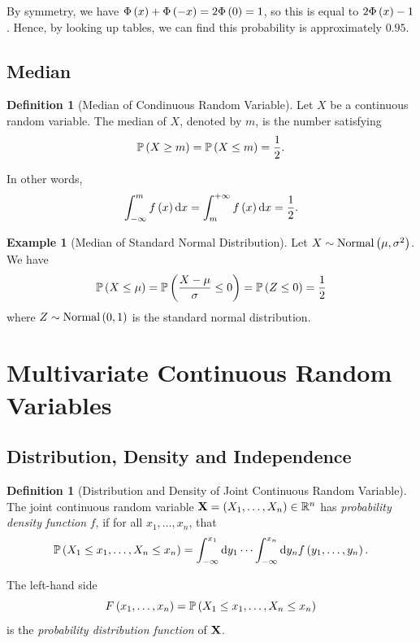 \documentclass{article}
\theoremstyle{definition}
\newtheorem{definition}[theorem]{Definition}
\newtheorem{example}[theorem]{Example}
\theoremstyle{remark}
\newcommand{\RR}{\mathbb{R}}
\newcommand{\Prob}{\mathbb{P}}
\newcommand{\plusinfty}{+\infty}
\newcommand{\minusinfty}{-\infty}
\newcommand{\sNormCdf}{\Phi}
\newcommand{\Normal}{\operatorname{Normal}}
\begin{document}
By symmetry, we have \(\sNormCdf\pqty{x} + \sNormCdf\pqty{-x} = 2 \sNormCdf\pqty{0} = 1\), so this is equal to \(2 \sNormCdf\pqty{x} - 1\). Hence, by looking up tables, we can find this probability is approximately \(0.95\).

\subsection{Median}

\begin{definition}[Median of Condinuous Random Variable]
    \label{def:median-continuous-rv}%
    Let \(X\) be a continuous random variable. The median of \(X\), denoted by \(m\), is the number satisfying
    \[
        \Prob\pqty{X \geq m} = \Prob\pqty{X \leq m} = \frac{1}{2}.
    \]

    In other words,
    \[
        \int_{\minusinfty}^{m} f\pqty{x} \dd{x} = \int_{m}^{\plusinfty} f\pqty{x} \dd{x} = \frac{1}{2}.
    \]
\end{definition}

\begin{example}[Median of Standard Normal Distribution]
    \label{ex:median-standard-normal}%
    Let \(X \sim \Normal\pqty{\mu, \sigma^2}\). We have
    \[
        \Prob\pqty{X \leq \mu} = \Prob\pqty{\frac{X - \mu}{\sigma} \leq 0} = \Prob\pqty{Z \leq 0} = \frac{1}{2}
    \]
    where \(Z \sim \Normal\pqty{0, 1}\) is the standard normal distribution.
\end{example}

\section{Multivariate Continuous Random Variables}

\subsection{Distribution, Density and Independence}

\begin{definition}[Distribution and Density of Joint Continuous Random Variable]
    \label{def:distribution-density-joint-crv}%
    The joint continuous random variable \(\vb{X} = \pqty{X_1, \ldots, X_n} \in \RR^n\) has \emph{probability density function} \(f\), if for all \(x_1, \ldots, x_n\), that
    \[
        \Prob\pqty{X_1 \leq x_1, \ldots, X_n \leq x_n} = \int_{\minusinfty}^{x_1} \dd{y_1} \cdots \int_{\minusinfty}^{x_n} \dd{y_n} f\pqty{y_1, \ldots, y_n}.
    \]

    The left-hand side
    \[
        F \pqty{x_1, \ldots, x_n} = \Prob\pqty{X_1 \leq x_1, \ldots, X_n \leq x_n}
    \]
    is the \emph{probability distribution function} of \(\vb{X}\).
\end{definition}
\end{document}
